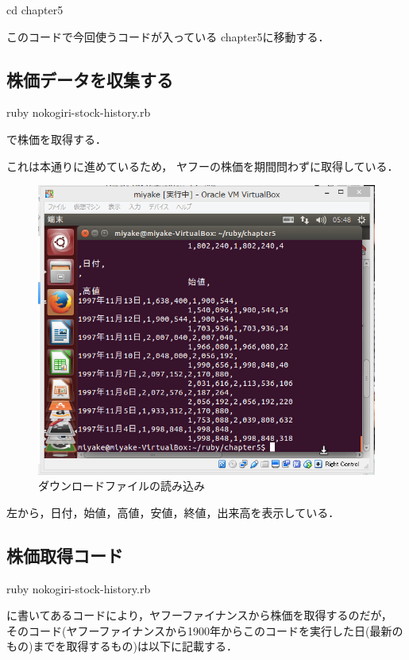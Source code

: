 cd chapter5

このコードで今回使うコードが入っている
chapter5に移動する．


\subsection{株価データを収集する}

ruby nokogiri-stock-history.rb

で株価を取得する．

これは本通りに進めているため，
ヤフーの株価を期間問わずに取得している．
\begin{figure}[H]
\centering
\includegraphics[width=15cm]{yahookabu.PNG}
\caption{ダウンロードファイルの読み込み}\label{サンプル図}
\end{figure}


左から，日付，始値，高値，安値，終値，出来高を表示している．

\subsection{株価取得コード}
ruby nokogiri-stock-history.rb

に書いてあるコードにより，ヤフーファイナンスから株価を取得するのだが，
そのコード(ヤフーファイナンスから1900年からこのコードを実行した日(最新のもの)までを取得するもの)は以下に記載する．

